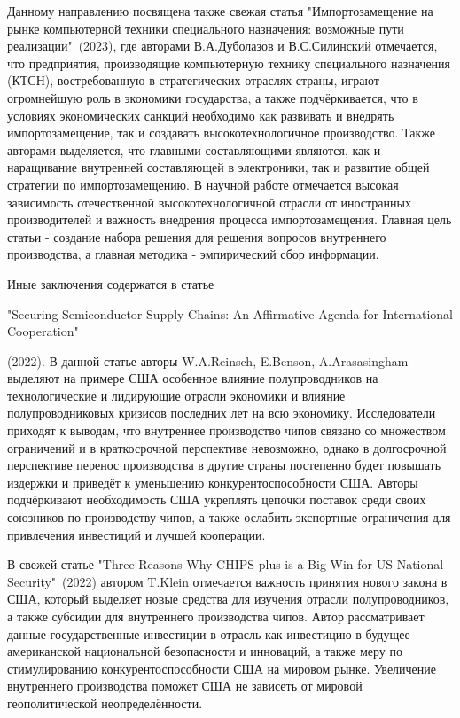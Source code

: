 \documentclass[14pt, a4paper]{extarticle}
\begin{document}
Данному направлению посвящена также свежая статья "Импортозамещение на рынке компьютерной техники специального назначения: возможные пути реализации"\   (2023), где авторами В.А.Дуболазов и В.С.Силинский отмечается, что предприятия, производящие компьютерную технику специального назначения (КТСН), востребованную в стратегических отраслях страны, играют огромнейшую роль в экономики государства, а также подчёркивается, что в условиях экономических санкций необходимо как развивать и внедрять импортозамещение, так и создавать высокотехнологичное производство. Также авторами выделяется, что главными составляющими являются, как и наращивание внутренней составляющей в электроники, так и развитие общей стратегии по импортозамещению. В научной работе отмечается высокая зависимость отечественной высокотехнологичной отрасли от иностранных производителей и важность внедрения процесса импортозамещения. Главная цель статьи - создание набора решения для решения вопросов внутреннего производства, а главная методика - эмпирический сбор информации.

Иные заключения содержатся в статье \begin{english} "Securing Semiconductor Supply Chains: An Affirmative Agenda for International Cooperation"\end{english} (2022). В данной статье авторы W.A.Reinsch, E.Benson, A.Arasasingham выделяют на примере США особенное влияние полупроводников на технологические и лидирующие отрасли экономики и влияние полупроводниковых кризисов последних лет на всю экономику. Исследователи приходят к выводам, что внутреннее производство чипов связано со множеством ограничений и в краткосрочной перспективе невозможно, однако в долгосрочной перспективе перенос производства в другие страны постепенно будет повышать издержки и приведёт к уменьшению конкурентоспособности США. Авторы подчёркивают необходимость США укреплять цепочки поставок среди своих союзников по производству чипов, а также ослабить экспортные ограничения для привлечения инвестиций и лучшей кооперации.

В свежей статье "Three Reasons Why CHIPS-plus is a Big Win for US National Security"\ (2022) автором T.Klein отмечается важность принятия нового закона в США, который выделяет новые средства для изучения отрасли полупроводников, а также субсидии для внутреннего производства чипов. Автор рассматривает данные государственные инвестиции в отрасль как инвестицию в будущее американской национальной безопасности и инноваций, а также меру по стимулированию конкурентоспособности США на мировом рынке. Увеличение внутреннего производства поможет США не зависеть от мировой геополитической неопределённости.
\end{document}
